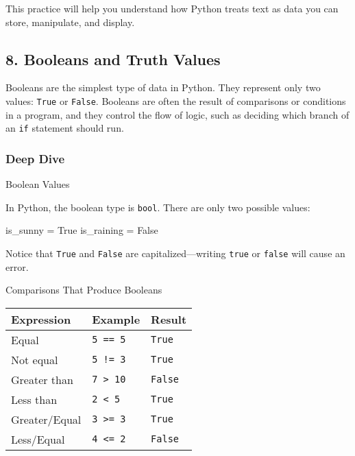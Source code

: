 \documentclass[
  letterpaper,
  DIV=11,
  numbers=noendperiod]{scrreprt}
\newenvironment{Shaded}{\begin{snugshade}}{\end{snugshade}}
\newcommand{\NormalTok}[1]{\textcolor[rgb]{0.00,0.23,0.31}{#1}}
\newcommand{\OperatorTok}[1]{\textcolor[rgb]{0.37,0.37,0.37}{#1}}
\newcommand{\VariableTok}[1]{\textcolor[rgb]{0.07,0.07,0.07}{#1}}
\begin{document}
This practice will help you understand how Python treats text as data
you can store, manipulate, and display.

\subsection{8. Booleans and Truth
Values}\label{booleans-and-truth-values}

Booleans are the simplest type of data in Python. They represent only
two values: \texttt{True} or \texttt{False}. Booleans are often the
result of comparisons or conditions in a program, and they control the
flow of logic, such as deciding which branch of an \texttt{if} statement
should run.

\subsubsection{Deep Dive}\label{deep-dive-8}

Boolean Values

In Python, the boolean type is \texttt{bool}. There are only two
possible values:

\begin{Shaded}
\begin{Highlighting}[]
\NormalTok{is\_sunny }\OperatorTok{=} \VariableTok{True}
\NormalTok{is\_raining }\OperatorTok{=} \VariableTok{False}
\end{Highlighting}
\end{Shaded}

Notice that \texttt{True} and \texttt{False} are capitalized---writing
\texttt{true} or \texttt{false} will cause an error.

Comparisons That Produce Booleans

\begin{longtable}[]{@{}lll@{}}
\toprule\noalign{}
Expression & Example & Result \\
\midrule\noalign{}
\endhead
\bottomrule\noalign{}
\endlastfoot
Equal & \texttt{5\ ==\ 5} & \texttt{True} \\
Not equal & \texttt{5\ !=\ 3} & \texttt{True} \\
Greater than & \texttt{7\ \textgreater{}\ 10} & \texttt{False} \\
Less than & \texttt{2\ \textless{}\ 5} & \texttt{True} \\
Greater/Equal & \texttt{3\ \textgreater{}=\ 3} & \texttt{True} \\
Less/Equal & \texttt{4\ \textless{}=\ 2} & \texttt{False} \\
\end{longtable}
\end{document}
